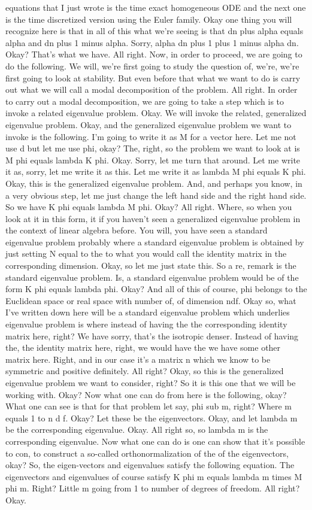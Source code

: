 \documentclass[10pt]{article}
\begin{document}
equations that I just wrote is the time exact homogeneous ODE and the next one is the time discretized version using the Euler family. Okay one thing you will recognize here is that in all of this what we're seeing is that dn plus alpha equals alpha and dn plus 1 minus alpha. Sorry, alpha dn plus 1 plus 1 minus alpha dn. Okay? That's what we have. All right. Now, in order to proceed, we are going to do the following. We will, we're first going to study the question of, we're, we're first going to look at stability. But even before that what we want to do is carry out what we will call a modal decomposition of the problem. All right. In order to carry out a modal decomposition, we are going to take a step which is to invoke a related eigenvalue problem. Okay. We will invoke the related, generalized eigenvalue problem. Okay, and the generalized eigenvalue problem we want to invoke is the following. I'm going to write it as M for a vector here. Let me not use d but let me use phi, okay? The, right, so the problem we want to look at is M phi equals lambda K phi. Okay. Sorry, let me turn that around. Let me write it as, sorry, let me write it as this. Let me write it as lambda M phi equals K phi. Okay, this is the generalized eigenvalue problem. And, and perhaps you know, in a very obvious step, let me just change the left hand side and the right hand side. So we have K phi equals lambda M phi. Okay? All right. Where, so when you look at it in this form, it if you haven't seen a generalized eigenvalue problem in the context of linear algebra before. You will, you have seen a standard eigenvalue problem probably where a standard eigenvalue problem is obtained by just setting N equal to the to what you would call the identity matrix in the corresponding dimension. Okay, so let me just state this. So a re, remark is the standard eigenvalue problem. Is, a standard eigenvalue problem would be of the form K phi equals lambda phi. Okay? And all of this of course, phi belongs to the Euclidean space or real space with number of, of dimension ndf. Okay so, what I've written down here will be a standard eigenvalue problem which underlies eigenvalue problem is where instead of having the the corresponding identity matrix here, right? We have sorry, that's the isotropic denser. Instead of having the, the identity matrix here, right, we would have the we have some other matrix here. Right, and in our case it's a matrix n which we know to be symmetric and positive definitely. All right? Okay, so this is the generalized eigenvalue problem we want to consider, right? So it is this one that we will be working with. Okay? Now what one can do from here is the following, okay? What one can see is that for that problem let say, phi sub m, right? Where m equals 1 to n d f. Okay? Let these be the eigenvectors. Okay, and let lambda m be the corresponding eigenvalue. Okay. All right so, so lambda m is the corresponding eigenvalue. Now what one can do is one can show that it's possible to con, to construct a so-called orthonormalization of the of the eigenvectors, okay? So, the eigen-vectors and eigenvalues satisfy the following equation. The eigenvectors and eigenvalues of course satisfy K phi m equals lambda m times M phi m. Right? Little m going from 1 to number of degrees of freedom. All right? Okay. 
\end{document}
